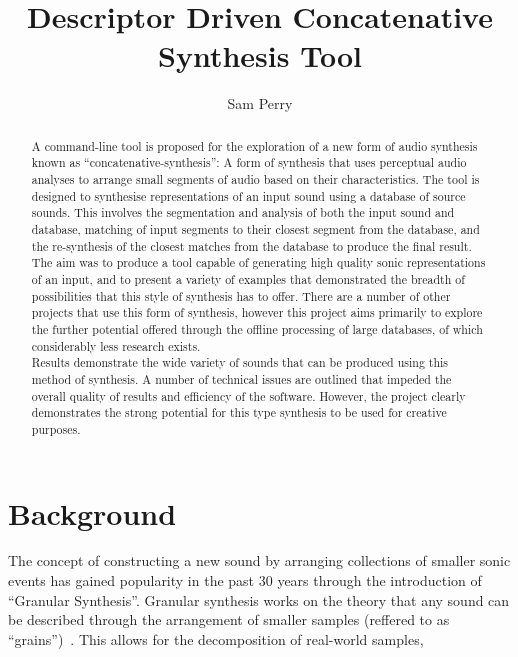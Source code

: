 \documentclass{scrartcl}
\begin{document}
    \title{Descriptor Driven Concatenative Synthesis Tool}
    \author{Sam Perry}

    \maketitle


    \begin{abstract} 
    A command-line tool is proposed for the exploration of a new form of audio
    synthesis known as ``concatenative-synthesis'': A form of synthesis that uses
    perceptual audio analyses to arrange small segments of audio based on their
    characteristics.  The tool is designed to synthesise representations of an
    input sound using a database of source sounds. This involves the
    segmentation and analysis of both the input sound and database, matching of
    input segments to their closest segment from the database, and the
    re-synthesis of the closest matches from the database to produce the final
    result.\\

    The aim was to produce a tool capable of generating high quality sonic
    representations of an input, and to present a variety of examples that
    demonstrated the breadth of possibilities that this style of synthesis has
    to offer. There are a number of other projects that use this form of
    synthesis, however this project aims primarily to explore the further
    potential offered through the offline processing of large databases, of
    which considerably less research exists.\\

    Results demonstrate the wide variety of sounds that can be produced using
    this method of synthesis. A number of technical issues are outlined that
    impeded the overall quality of results and efficiency of the software.
    However, the project clearly demonstrates the strong potential for this
    type synthesis to be used for creative purposes.
    \end{abstract}

    \section*{Background}
    The concept of constructing a new sound by arranging collections of smaller
    sonic events has gained popularity in the past 30 years through the
    introduction of ``Granular Synthesis''. Granular synthesis works on the
    theory that any sound can be described through the arrangement of smaller
    samples (reffered to as ``grains'')~\parencite{itgs1988cr}. This allows
    for the decomposition of real-world samples, 
\end{document}
